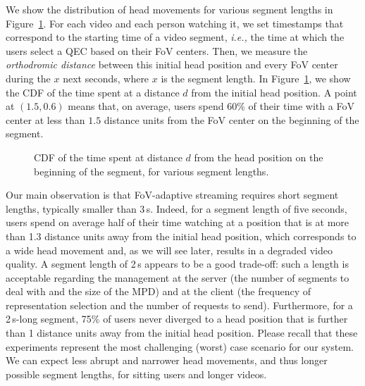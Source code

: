 We show the distribution of head movements for various segment lengths in Figure~\ref{cdf-dataset}.
For each video
and each person watching it, we set timestamps that correspond to the starting time of a video segment,
\textit{i.e.,} the time at which the users select a QEC based on their FoV centers.
Then, we measure the \emph{orthodromic distance} between this initial head position and every FoV center
during the $x$ next seconds, where $x$ is the segment length. In Figure~\ref{cdf-dataset}, we show the \ac{CDF} of the time spent at a distance
$d$ from the initial head position. A point at $(1.5,0.6)$ means that, on average, users spend $60\%$ of
their time with a FoV center at less than $1.5$ distance units from the FoV center on the beginning of the segment.

\begin{figure}[htbp]
\centering

\caption{CDF of the time spent at distance $d$ from the head position on the beginning of the
segment, for various segment lengths.}\label{cdf-dataset}
\end{figure}

Our main observation is that FoV-adaptive streaming requires short segment lengths, typically
smaller than 3\,s. Indeed, for a segment length of five seconds,
users spend on average half of their time watching at a position that is at more than
1.3 distance units away from the initial head position,
which corresponds to a wide head movement and, as we will see later, results in a degraded video quality.
A segment length of 2\,s appears to be a good trade-off: such a length is acceptable regarding the
management at the server (the number of segments to deal with and the size of the \ac{MPD})
and at the client (the frequency of representation selection and the number of requests
to send). Furthermore, for a 2\,s-long segment, 75\% of users never diverged to
a head position that is further than 1 distance units away from the initial head position. Please recall that these experiments represent the most challenging (worst) case scenario for our system.
We can expect less abrupt and narrower head movements, and thus longer possible segment lengths, for sitting
users and longer videos.
